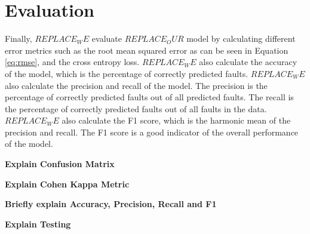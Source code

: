\section{Evaluation}
\label{sec:model_evaluation}

Finally, $REPLACE_WE$ evaluate $REPLACE_OUR$ model by calculating different error metrics such as the root mean squared error as can be seen in Equation \ref{eq:rmse}, and the cross entropy loss. $REPLACE_WE$ also calculate the accuracy of the model, which is the percentage of correctly predicted faults. $REPLACE_WE$ also calculate the precision and recall of the model. The precision is the percentage of correctly predicted faults out of all predicted faults. The recall is the percentage of correctly predicted faults out of all faults in the data. $REPLACE_WE$ also calculate the F1 score, which is the harmonic mean of the precision and recall. The F1 score is a good indicator of the overall performance of the model.


\textbf{Explain Confusion Matrix}

\textbf{Explain Cohen Kappa Metric}

\textbf{Briefly explain Accuracy, Precision, Recall and F1}

\textbf{Explain Testing}